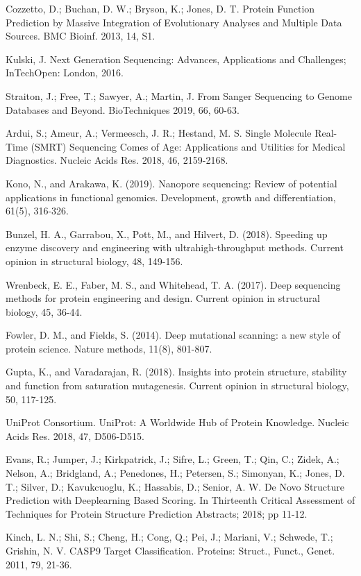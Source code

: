 \documentclass[12pt]{article}
\begin{document}
\begin{thebibliography}{99}
 Cozzetto, D.; Buchan, D. W.; Bryson, K.; Jones, D. T. Protein Function Prediction by Massive Integration of Evolutionary Analyses and Multiple Data Sources. BMC Bioinf. 2013, 14, S1.

 Kulski, J. Next Generation Sequencing: Advances, Applications and Challenges; InTechOpen: London, 2016.

 Straiton, J.; Free, T.; Sawyer, A.; Martin, J. From Sanger Sequencing to Genome Databases and Beyond. BioTechniques 2019, 66, 60-63.

 Ardui, S.; Ameur, A.; Vermeesch, J. R.; Hestand, M. S. Single Molecule Real-Time (SMRT) Sequencing Comes of Age: Applications and Utilities for Medical Diagnostics. Nucleic Acids Res. 2018, 46, 2159-2168.

Kono, N., and Arakawa, K. (2019). Nanopore sequencing: Review of potential applications in functional genomics. Development, growth and differentiation, 61(5), 316-326.

 Bunzel, H. A., Garrabou, X., Pott, M., and Hilvert, D. (2018). Speeding up enzyme discovery and engineering with ultrahigh-throughput methods. Current opinion in structural biology, 48, 149-156.

 Wrenbeck, E. E., Faber, M. S., and Whitehead, T. A. (2017). Deep sequencing methods for protein engineering and design. Current opinion in structural biology, 45, 36-44.

 Fowler, D. M., and Fields, S. (2014). Deep mutational scanning: a new style of protein science. Nature methods, 11(8), 801-807.

 Gupta, K., and Varadarajan, R. (2018). Insights into protein structure, stability and function from saturation mutagenesis. Current opinion in structural biology, 50, 117-125.

 UniProt Consortium. UniProt: A Worldwide Hub of Protein Knowledge. Nucleic Acids Res. 2018, 47, D506-D515.

 Evans, R.; Jumper, J.; Kirkpatrick, J.; Sifre, L.; Green, T.; Qin, C.; Zidek, A.; Nelson, A.; Bridgland, A.; Penedones, H.; Petersen, S.; Simonyan, K.; Jones, D. T.; Silver, D.; Kavukcuoglu, K.; Hassabis, D.; Senior, A. W. De Novo Structure Prediction with Deeplearning Based Scoring. In Thirteenth Critical Assessment of Techniques for Protein Structure Prediction Abstracts; 2018; pp 11-12.

 Kinch, L. N.; Shi, S.; Cheng, H.; Cong, Q.; Pei, J.; Mariani, V.; Schwede, T.; Grishin, N. V. CASP9 Target Classification. Proteins: Struct., Funct., Genet. 2011, 79, 21-36.


\end{thebibliography}
\end{document}
